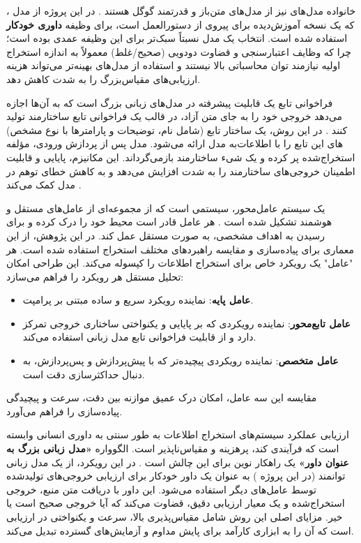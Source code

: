 خانواده مدل‌های  نیز از مدل‌های متن‌باز و قدرتمند گوگل هستند \cite{google2024gemma}. در این پروژه از مدل ، که یک نسخه آموزش‌دیده برای پیروی از دستورالعمل است، برای وظیفه \textbf{داوری خودکار} استفاده شده است. انتخاب یک مدل نسبتاً سبک‌تر برای این وظیفه عمدی بوده است؛ چرا که وظایف اعتبارسنجی و قضاوت دودویی (صحیح/غلط) معمولاً به اندازه استخراج اولیه نیازمند توان محاسباتی بالا نیستند و استفاده از مدل‌های بهینه‌تر می‌تواند هزینه ارزیابی‌های مقیاس‌بزرگ را به شدت کاهش دهد.


فراخوانی تابع یک قابلیت پیشرفته در مدل‌های زبانی بزرگ است که به آن‌ها اجازه می‌دهد خروجی خود را به جای متن آزاد، در قالب یک فراخوانی تابع ساختارمند تولید کنند \cite{gemini2023team}. در این روش، یک ساختار تابع (شامل نام، توضیحات و پارامترها با نوع مشخص) به مدل ارائه می‌شود. مدل پس از پردازش ورودی، مؤلفه‎‌های این تابع را با اطلاعات استخراج‌شده پر کرده و یک شیء ساختارمند بازمی‌گرداند. این مکانیزم، پایایی و قابلیت اطمینان خروجی‌های ساختارمند را به شدت افزایش می‌دهد و به کاهش خطای توهم در مدل کمک می‌کند \cite{ji2023survey}.


یک سیستم عامل‌محور، سیستمی است که از مجموعه‌ای از عامل‌های مستقل و هوشمند تشکیل شده است \cite{wooldridge1995intelligent, russell2010artificial}. هر عامل قادر است محیط خود را درک کرده و برای رسیدن به اهداف مشخصی، به صورت مستقل عمل کند. در این پژوهش، از این معماری برای پیاده‌سازی و مقایسه راهبردهای مختلف استخراج استفاده شده است. هر "عامل" یک رویکرد خاص برای استخراج اطلاعات را کپسوله می‌کند. این طراحی امکان تحلیل مستقل هر رویکرد را فراهم می‌سازد:
\begin{itemize}
    \item \textbf{عامل پایه}: نماینده رویکرد سریع و ساده مبتنی بر پرامپت.
    \item \textbf{عامل تابع‌محور}: نماینده رویکردی که بر پایایی و یکنواختی ساختاری خروجی تمرکز دارد و از قابلیت فراخوانی تابع مدل زبانی استفاده می‌کند.
    \item \textbf{عامل متخصص}: نماینده رویکردی پیچیده‌تر که با پیش‌پردازش و پس‌پردازش، به دنبال حداکثرسازی دقت است.
\end{itemize}
مقایسه این سه عامل، امکان درک عمیق موازنه بین دقت، سرعت و پیچیدگی پیاده‌سازی را فراهم می‌آورد.

ارزیابی عملکرد سیستم‌های استخراج اطلاعات به طور سنتی به داوری انسانی وابسته است که فرآیندی کند، پرهزینه و مقیاس‌ناپذیر است. الگوواره \textbf{«مدل زبانی بزرگ به عنوان داور»} یک راهکار نوین برای این چالش است \cite{zheng2023judging}. در این رویکرد، از یک مدل زبانی توانمند (در این پروژه ) به عنوان یک داور خودکار برای ارزیابی خروجی‌های تولیدشده توسط عامل‌های دیگر استفاده می‌شود. این داور با دریافت متن منبع، خروجی استخراج‌شده و یک معیار ارزیابی دقیق، قضاوت می‌کند که آیا خروجی صحیح است یا خیر. مزایای اصلی این روش شامل مقیاس‌پذیری بالا، سرعت و یکنواختی در ارزیابی است که آن را به ابزاری کارآمد برای پایش مداوم و آزمایش‌های گسترده تبدیل می‌کند.

